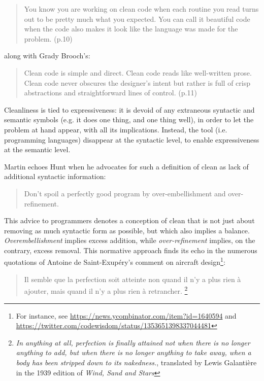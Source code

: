 \begin{quote}
  You know you are working on clean code when each routine you read turns out to be pretty much what you expected. You can call it beautiful code when the code also makes it look like the language was made for the problem. \citep{martin_clean_2008} (p.10)
\end{quote}

along with Grady Brooch's:

\begin{quote}
  Clean code is simple and direct. Clean code reads like well-written prose. Clean code never obscures the designer’s intent but rather is full of crisp abstractions and straightforward lines of control. \citep{martin_clean_2008} (p.11)
\end{quote}

Cleanliness is tied to expressiveness: it is devoid of any extraneous syntactic and semantic symbols (e.g. it does one thing, and one thing well), in order to let the problem at hand appear, with all its implications. Instead, the tool (i.e. programming languages) disappear at the syntactic level, to enable expressiveness at the semantic level.

Martin echoes Hunt when he advocates for such a definition of clean as lack of additional syntactic information:

\begin{quote}
  Don't spoil a perfectly good program by over-embellishment and over-refinement. \citep{hunt_pragmatic_1999}
\end{quote}

This advice to programmers denotes a conception of clean that is not just about removing as much syntactic form as possible, but which also implies a balance. \emph{Overembellishment} implies excess addition, while \emph{over-refinement} implies, on the contrary, excess removal. This normative approach finds its echo in the numerous quotations of Antoine de Saint-Exupéry's comment on aircraft design\footnote{For instance, see \url{https://news.ycombinator.com/item?id=1640594} and \url{https://twitter.com/codewisdom/status/1353651398337044481}}:

\begin{quote}
  Il semble que la perfection soit atteinte non quand il n'y a plus rien à ajouter, mais quand il n'y a plus rien à retrancher.  \citep{desaint-exupery_terre_1972}\footnote{\emph{ In anything at all, perfection is finally attained not when there is no longer anything to add, but when there is no longer anything to take away, when a body has been stripped down to its nakedness.}, translated by Lewis Galantière in the 1939 edition of \emph{Wind, Sand and Stars}}
\end{quote}


